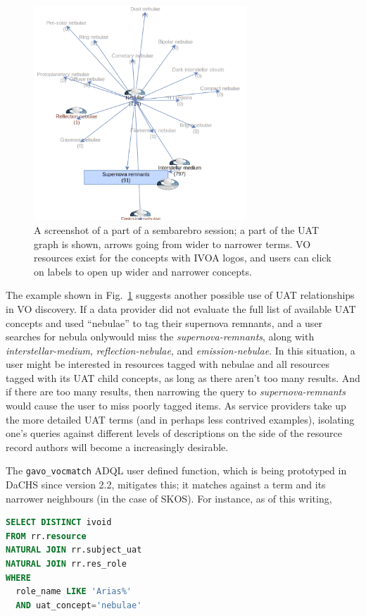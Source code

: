 \documentclass[11pt,a4paper]{ivoa}
\newcommand{\vocterm}[1]{\emph{\color{termcolor}#1}}
\begin{document}
\begin{figure}
\includegraphics[width=8cm]{sembarebro.png}
\caption{A screenshot of a part of a sembarebro session; a part of the
UAT graph is shown, arrows going from wider to narrower terms.  VO
resources exist for the concepts with IVOA logos, and users can click on
labels to open up wider and narrower concepts.}
\label{fig:sembarebro}
\end{figure}

The example shown in Fig.~\ref{fig:sembarebro} suggests another possible
use of UAT relationships in VO discovery. If a data provider did not evaluate
the full list of available UAT concepts and used ``nebulae'' to tag their
supernova remnants, and a user searches for nebula onlywould miss the
\vocterm{supernova-remnants}, along with \vocterm{interstellar-medium},
\vocterm{reflection-nebulae}, and \vocterm{emission-nebulae}. In this situation,
a user might be interested in resources tagged with nebulae and all resources
tagged with its UAT child concepts, as long as there aren't too many results.
And if there are too many results, then narrowing the query to 
\vocterm{supernova-remnants}
would cause the user to miss poorly tagged items.  As service
providers take up the more detailed UAT terms (and in perhaps less
contrived examples), isolating one's queries against different levels
of descriptions on the side of the resource record authors will become a
increasingly desirable.

The \verb|gavo_vocmatch| ADQL user defined function, which is being
prototyped in DaCHS \citep{2014A+C.....7...27D} since
version 2.2, mitigates this; it matches against a term and its narrower
neighbours (in the case of SKOS).  For instance, as of this writing,

\begin{minipage}{12cm}
\begin{lstlisting}[language=SQL]
SELECT DISTINCT ivoid 
FROM rr.resource
NATURAL JOIN rr.subject_uat
NATURAL JOIN rr.res_role
WHERE
  role_name LIKE 'Arias%'
  AND uat_concept='nebulae'
\end{lstlisting}
\end{minipage}
\end{document}
